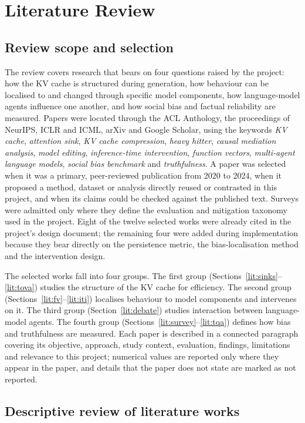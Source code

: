 \chapter{Literature Review}
\section{Review scope and selection}
The review covers research that bears on four questions raised by the project: how the KV cache is structured during generation, how behaviour can be localised to and changed through specific model components, how language-model agents influence one another, and how social bias and factual reliability are measured. Papers were located through the ACL Anthology, the proceedings of NeurIPS, ICLR and ICML, arXiv and Google Scholar, using the keywords \emph{KV cache}, \emph{attention sink}, \emph{KV cache compression}, \emph{heavy hitter}, \emph{causal mediation analysis}, \emph{model editing}, \emph{inference-time intervention}, \emph{function vectors}, \emph{multi-agent language models}, \emph{social bias benchmark} and \emph{truthfulness}. A paper was selected when it was a primary, peer-reviewed publication from 2020 to 2024, when it proposed a method, dataset or analysis directly reused or contrasted in this project, and when its claims could be checked against the published text. Surveys were admitted only where they define the evaluation and mitigation taxonomy used in the project. Eight of the twelve selected works were already cited in the project's design document; the remaining four were added during implementation because they bear directly on the persistence metric, the bias-localisation method and the intervention design.

The selected works fall into four groups. The first group (Sections~\ref{lit:sinks}--\ref{lit:tova}) studies the structure of the KV cache for efficiency. The second group (Sections~\ref{lit:fv}--\ref{lit:iti}) localises behaviour to model components and intervenes on it. The third group (Section~\ref{lit:debate}) studies interaction between language-model agents. The fourth group (Sections~\ref{lit:survey}--\ref{lit:tqa}) defines how bias and truthfulness are measured. Each paper is described in a connected paragraph covering its objective, approach, study context, evaluation, findings, limitations and relevance to this project; numerical values are reported only where they appear in the paper, and details that the paper does not state are marked as not reported.

\section{Descriptive review of literature works}

